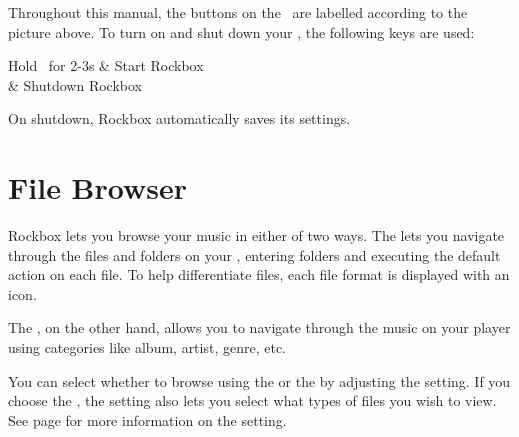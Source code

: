 Throughout this manual, the buttons on the \dap\ are labelled according to the
picture above. To turn on and shut down your \dap, the following keys are used:

\begin{table}
    \begin{btnmap}{}{}
        {Hold \ButtonOn\ for 2{}-3s}
      & Start Rockbox\\
      & Shutdown Rockbox\\
    \end{btnmap}
\end{table}
\label{ref:Safeshutdown}On shutdown, Rockbox automatically saves its settings.


\section{\label{ref:file_browser}File Browser}
Rockbox lets you browse your music in either of two ways. The 
 lets you navigate through the files and folders on 
your \dap, entering folders and executing the default action on each file.
To help differentiate files, each file format is displayed with an icon. 

The , on the other hand, allows you to navigate 
through the music on your player using categories like album, artist, genre,
etc.

You can select whether to browse using the  or the 
 by adjusting the  setting.  
If you choose the , the  setting also
lets you select what types of files you wish to view.  See page 
\pageref{ref:ShowFiles} for more information on the 
setting.

